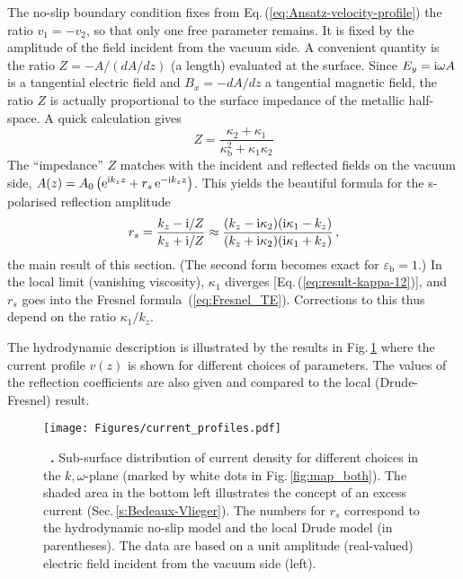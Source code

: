 \documentclass[11pt, oneside]{article}   	%
\newcommand{\bulk}[1]{_{\mathrm{#1}}}
\renewcommand{\caption}[2][]{\refstepcounter{figure}%
\vspace*{1ex}\hspace*{8.5ex}%
\parbox{0.8\textwidth}{\small
\textbf{\figurename~\arabic{figure}.} #2}}
\begin{document}
The no-slip boundary condition fixes from Eq.\,(\ref{eq:Ansatz-velocity-profile})
the ratio $v_1 = - v_2$,
so that only one free parameter remains. It is fixed by
the amplitude of the field incident from the vacuum side. A convenient quantity
is the ratio $Z = -A / (dA / dz)$ (a length) evaluated at the surface. 
Since $E_y = {\rm i}\omega A$ is 
a tangential electric field and $B_x = - d A / dz$ a tangential magnetic field,
the ratio $Z$ is actually proportional to the surface impedance of the metallic half-space. 
A quick calculation gives
\begin{equation}
Z 
 = \frac{ \kappa_2 + \kappa_1
   }{ \kappa\bulk{b}^2 + \kappa_1 \kappa_2 }
\label{eq:}
\end{equation}
The ``impedance'' $Z$ matches with the incident and reflected fields on the vacuum side, 
$A(z) = A_{0} \left( {\rm e}^{ {\rm i} k_z z } + r_s \, {\rm e}^{ - {\rm i} k_z z } \right)$. 
This yields the beautiful
formula for the s-polarised reflection amplitude
\begin{equation}
r_s = \frac{ k_z - {\rm i}/Z }{ k_z + {\rm i}/Z } \approx 
\frac{ ( k_z - {\rm i}\kappa_2)({\rm i}\kappa_1 - k_z) }{ ( k_z + {\rm i}\kappa_2)({\rm i}\kappa_1 + k_z) }
\,,
\label{eq:}
\end{equation}
the main result of this section. (The second form becomes exact for $\varepsilon\bulk{b} = 1$.)
In the local limit (vanishing viscosity), $\kappa_1$
diverges [Eq.\,(\ref{eq:result-kappa-12})], 
and $r_s$ goes into the Fresnel formula~(\ref{eq:Fresnel_TE}). 
Corrections to this thus depend on the ratio $\kappa_1 / k_z$.

The hydrodynamic description is illustrated by the results in Fig.\,\ref{fig:current-profile}
where the current profile $v(z)$ is shown for different choices of parameters. 
The values of the reflection coefficients are also given and compared to the local
(Drude-Fresnel) result.

\begin{figure}[bth]
\centerline{%
\texttt{[image: Figures/current\_profiles.pdf]}%
}
\caption[]{Sub-surface distribution of current density
for different choices
in the $k,\omega$-plane (marked by white dots in Fig.\,\ref{fig:map_both}).
The shaded area in the bottom left illustrates the concept of an excess current
(Sec.\,\ref{s:Bedeaux-Vlieger}).
The numbers for $r_s$ correspond to the hydrodynamic no-slip model and the local
Drude model (in parentheses). The data are based on a unit amplitude (real-valued)
electric field incident from the vacuum side (left).
}
\label{fig:current-profile}
\end{figure}
\end{document}
